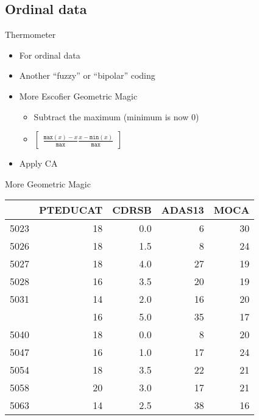 \documentclass[
  ignorenonframetext,
]{beamer}
\providecommand{\tightlist}{%
  \setlength{\itemsep}{0pt}\setlength{\parskip}{0pt}}
\begin{document}
\hypertarget{ordinal-data}{%
\subsection{Ordinal data}\label{ordinal-data}}

\begin{frame}{Thermometer}
\protect\hypertarget{thermometer}{}

\begin{itemize}[<+->]
\tightlist
\item
  For ordinal data
\item
  Another ``fuzzy'' or ``bipolar'' coding
\item
  More Escofier Geometric Magic

  \begin{itemize}[<+->]
  \tightlist
  \item
    Subtract the maximum (minimum is now \(0\))
  \item
    \(\begin{bmatrix} \frac{\texttt{max}(x)-x}{\texttt{max}} \frac{x-\texttt{min}(x)}{\texttt{max}}\end{bmatrix}\)
  \end{itemize}
\item
  Apply CA
\end{itemize}

\end{frame}

\begin{frame}{More Geometric Magic}
\protect\hypertarget{more-geometric-magic}{}

\begin{table}[H]
\centering\begingroup\fontsize{7}{9}\selectfont

\begin{tabular}{lrrrr}
\toprule
  & PTEDUCAT & CDRSB & ADAS13 & MOCA\\
\midrule
5023 & 18 & 0.0 & 6 & 30\\
5026 & 18 & 1.5 & 8 & 24\\
5027 & 18 & 4.0 & 27 & 19\\
5028 & 16 & 3.5 & 20 & 19\\
5031 & 14 & 2.0 & 16 & 20\\
\addlinespace
5037 & 16 & 5.0 & 35 & 17\\
5040 & 18 & 0.0 & 8 & 20\\
5047 & 16 & 1.0 & 17 & 24\\
5054 & 18 & 3.5 & 22 & 21\\
5058 & 20 & 3.0 & 17 & 21\\
5063 & 14 & 2.5 & 38 & 16\\
\bottomrule
\end{tabular}\endgroup{}
\end{table}

\end{frame}
\end{document}

